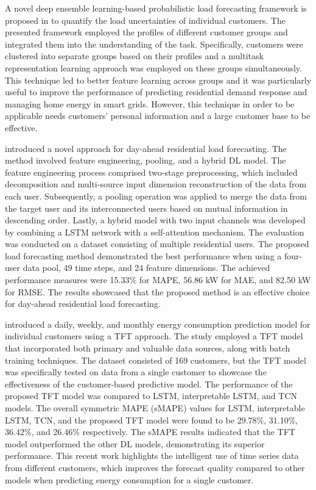 A novel deep ensemble learning-based probabilistic load forecasting framework is proposed in \cite{YANG2019116324} to quantify the load uncertainties of individual customers.
The presented framework employed the profiles of different customer groups and integrated them into the understanding of the task.
Specifically, customers were clustered into separate groups based on their profiles and a multitask representation learning approach was employed on these groups simultaneously.
This technique led to better feature learning across groups and it was particularly useful to improve the performance of predicting residential demand response and managing home energy in smart grids.
However, this technique in order to be applicable needs customers’ personal information and a large customer base to be effective.

\cite{ZANG2021120682} introduced a novel approach for day-ahead residential load forecasting.
The method involved feature engineering, pooling, and a hybrid DL model.
The feature engineering process comprised two-stage preprocessing, which included decomposition and multi-source input dimension reconstruction of the data from each user.
Subsequently, a pooling operation was applied to merge the data from the target user and its interconnected users based on mutual information in descending order.
Lastly, a hybrid model with two input channels was developed by combining a LSTM network with a self-attention mechanism.
The evaluation was conducted on a dataset consisting of multiple residential users.
The proposed load forecasting method demonstrated the best performance when using a four-user data pool, 49 time steps, and 24 feature dimensions.
The achieved performance measures were 15.33\% for MAPE, 56.86 kW for MAE, and 82.50 kW for RMSE.
The results showcased that the proposed method is an effective choice for day-ahead residential load forecasting.

\cite{NAZIR2023100888} introduced a daily, weekly, and monthly energy consumption prediction model for individual customers using a TFT approach.
The study employed a TFT model that incorporated both primary and valuable data sources, along with batch training techniques.
The dataset consisted of 169 customers, but the TFT model was specifically tested on data from a single customer to showcase the effectiveness of the customer-based predictive model.
The performance of the proposed TFT model was compared to LSTM, interpretable LSTM, and TCN models.
The overall symmetric MAPE (sMAPE) values for LSTM, interpretable LSTM, TCN, and the proposed TFT model were found to be 29.78\%, 31.10\%, 36.42\%, and 26.46\% respectively.
The sMAPE results indicated that the TFT model outperformed the other DL models, demonstrating its superior performance.
This recent work highlights the intelligent use of time series data from different customers, which improves the forecast quality compared to other models when predicting energy consumption for a single customer.


